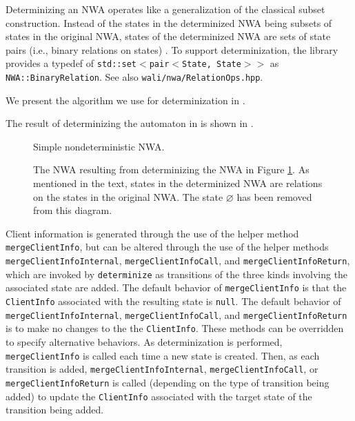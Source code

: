 Determinizing an NWA operates like a
generalization of the classical subset construction.  Instead of the states
in the determinized NWA being subsets of states in the original NWA, states of the
determinized NWA are sets of state pairs (i.e., binary relations on states)
\cite{JACM:AM2009}.  To support determinization, the library provides a
typedef of \texttt{std::set$<$pair$<$State, State$>>$} as 
\texttt{NWA::BinaryRelation}. See also \texttt{wali/nwa/RelationOps.hpp}.

We present the algorithm we use for determinization in
.



The result of determinizing the automaton in  is shown in
.

\begin{figure}[p]
  \centering
  \caption{Simple nondeterministic NWA.}
  \label{Fi:Det1}
\end{figure}


\begin{figure}[p]
  \centering
    \caption{The NWA resulting from determinizing the NWA in Figure
      \ref{Fi:Det1}. As mentioned in the text, states in the determinized NWA
      are relations on the states in the original NWA. The state
      $\varnothing$ has been removed from this diagram.} 
  \label{Fi:Det2}
\end{figure}


Client information is generated through the use of the helper method
\texttt{mergeClientInfo}, but can be altered through the use of the helper
methods \texttt{mergeClientInfoInternal}, \texttt{mergeClientInfoCall}, and
\texttt{mergeClientInfoReturn}, which are invoked by \texttt{determinize} as
transitions of the three kinds involving the associated state are added.  The
default behavior of \texttt{mergeClientInfo} is that the \texttt{ClientInfo}
associated with the resulting state is \texttt{null}.  The default behavior
of \texttt{mergeClientInfoInternal}, \texttt{mergeClientInfoCall}, and
\texttt{mergeClientInfoReturn} is to make no changes to the the
\texttt{ClientInfo}.  These methods can be overridden to specify alternative
behaviors.  As determinization is performed, \texttt{mergeClientInfo} is
called each time a new state is created.  Then, as each transition is added,
\texttt{mergeClientInfoInternal}, \texttt{mergeClientInfoCall}, or
\texttt{mergeClientInfoReturn} is called (depending on the type of transition
being added) to update the \texttt{ClientInfo} associated with the target
state of the transition being added.

